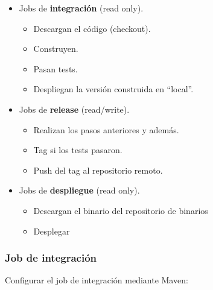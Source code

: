 \begin{itemize}
    \item Jobs de \textbf{integración} (read only).
        \begin{itemize}
            \item Descargan el código (checkout).
            \item Construyen.
            \item Pasan tests.
            \item Despliegan la versión construida en ``local''.
        \end{itemize}
    \item Jobs de \textbf{release} (read/write).
        \begin{itemize}
            \item Realizan los pasos anteriores y además.
            \item Tag si los tests pasaron.
            \item Push del tag al repositorio remoto.
        \end{itemize}
    \item Jobs de \textbf{despliegue} (read only).
        \begin{itemize}
            \item Descargan el binario del repositorio de binarios
            \item Desplegar
        \end{itemize}
\end{itemize}

\subsubsection{Job de integración}
\label{subs:jenkins-job-integracion}

\par Configurar el job de integración mediante Maven:

